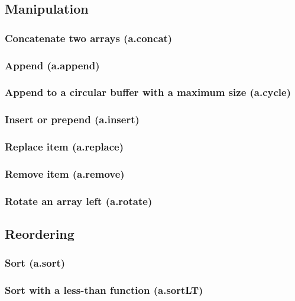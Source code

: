 \documentclass{article}
\theoremstyle{definition}
\begin{document}
\subsection{Manipulation}

\subsubsection{Concatenate two arrays (a.concat)}

\subsubsection{Append (a.append)}

\subsubsection{Append to a circular buffer with a maximum size (a.cycle)}

\subsubsection{Insert or prepend (a.insert)}

\subsubsection{Replace item (a.replace)}

\subsubsection{Remove item (a.remove)}

\subsubsection{Rotate an array left (a.rotate)}

\subsection{Reordering}

\subsubsection{Sort (a.sort)}

\subsubsection{Sort with a less-than function (a.sortLT)}
\end{document}
